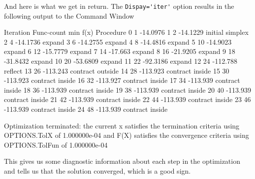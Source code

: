 And here is what we get in return.  The \lstinline{Dispay='iter'} option results in the following output to the Command Window
\begin{stdout}
    Iteration   Func-count     min f(x)         Procedure
     0            1         -14.0976         
     1            2         -14.1229         initial simplex
     2            4         -14.1736         expand
     3            6         -14.2755         expand
     4            8         -14.4816         expand
     5           10         -14.9023         expand
     6           12         -15.7779         expand
     7           14          -17.663         expand
     8           16         -21.9205         expand
     9           18         -31.8432         expand
    10           20         -53.6809         expand
    11           22         -92.3186         expand
    12           24         -112.788         reflect
    13           26         -113.243         contract outside
    14           28         -113.923         contract inside
    15           30         -113.923         contract inside
    16           32         -113.927         contract inside
    17           34         -113.939         contract inside
    18           36         -113.939         contract inside
    19           38         -113.939         contract inside
    20           40         -113.939         contract inside
    21           42         -113.939         contract inside
    22           44         -113.939         contract inside
    23           46         -113.939         contract inside
    24           48         -113.939         contract inside
 
Optimization terminated:
 the current x satisfies the termination criteria using OPTIONS.TolX of 1.000000e-04 
 and F(X) satisfies the convergence criteria using OPTIONS.TolFun of 1.000000e-04 
\end{stdout}
This gives us some diagnostic information about each step in the optimization and tells us that the solution converged, which is a good sign.

